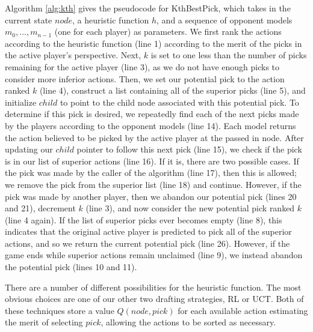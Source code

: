 \documentclass[letterpaper]{article}
\numberwithin{equation}{section}
\numberwithin{theorem}{section}
\numberwithin{lemma}{section}
\numberwithin{df}{section}
\begin{document}
Algorithm \ref{alg:kth} gives the pseudocode for KthBestPick, which takes in the current state $node$, a heuristic function $h$, and a sequence of opponent models $m_0, ..., m_{n-1}$ (one for each player) as parameters.  We first rank the actions according to the heuristic function (line 1) according to the merit of the picks in the active player's perspective.  Next, $k$ is set to one less than the number of picks remaining for the active player (line 3), as we do not have enough picks to consider more inferior actions.  Then, we set our potential pick to the action ranked $k$ (line 4), construct a list containing all of the superior picks (line 5), and initialize $child$ to point to the child node associated with this potential pick.  To determine if this pick is desired, we repeatedly find each of the next picks made by the players according to the opponent models (line 14).  Each model returns the action believed to be picked by the active player at the passed in node.  After updating our $child$ pointer to follow this next pick (line 15), we check if the pick is in our list of superior actions (line 16).  If it is, there are two possible cases.  If the pick was made by the caller of the algorithm (line 17), then this is allowed; we remove the pick from the superior list (line 18) and continue.  However, if the pick was made by another player, then we abandon our potential pick (lines 20 and 21), decrement $k$ (line 3), and now consider the new potential pick ranked $k$ (line 4 again).  If the list of superior picks ever becomes empty (line 8), this indicates that the original active player is predicted to pick all of the superior actions, and so we return the current potential pick (line 26).  However, if the game ends while superior actions remain unclaimed (line 9), we instead abandon the potential pick (lines 10 and 11). 

There are a number of different possibilities for the heuristic function.  The most obvious choices are one of our other two drafting strategies, RL or UCT.  Both of these techniques store a value $Q(node,pick)$ for each available action estimating the merit of selecting $pick$, allowing the actions to be sorted as necessary.
\end{document}
